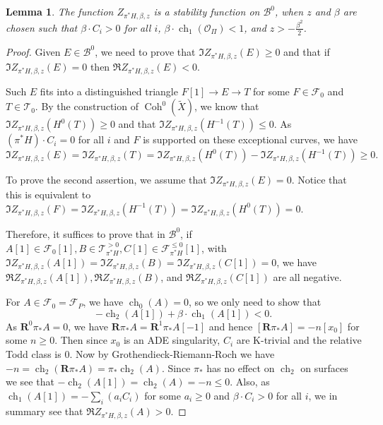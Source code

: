 \documentclass[12pt]{amsart}
\newtheorem{lemma}[theorem]{Lemma}
\theoremstyle{definition}
\DeclareMathOperator{\Coh}{Coh}
\DeclareMathOperator{\ch}{ch}
\begin{document}
\begin{lemma}\label{stabfunc}
The function $Z_{\pi^\ast H,\beta,z}$ is a stability function on $\mathcal{B}^0$, when $z$ and $\beta$ are chosen such that $\beta \cdot C_i>0$ for all $i$, 
$\beta \cdot \ch_1(\mathcal{O}_{\Pi}) <1$, and $z> -\frac{\beta^2}{2}$.
\end{lemma}
\begin{proof}
Given $E \in \mathcal{B}^0$, we need to prove that $\Im Z_{\pi^\ast H,\beta,z}(E)\geq 0$ and that if $\Im Z_{\pi^\ast H,\beta,z}(E)=0$ then $\Re Z_{\pi^\ast H,\beta,z}(E)<0$.

Such $E$ fits into a distinguished triangle $F[1] \longrightarrow E \longrightarrow T$ for some $F \in \mathcal{F}_0$ and $T \in \mathcal{T}_0$.
By the construction of $\Coh^0(\widetilde{X})$, we know that $\Im Z_{\pi^\ast H,\beta,z}(H^0(T)) \geq 0$ and that $\Im Z_{\pi^\ast H,\beta,z}(H^{-1}(T)) \leq 0$.
As $(\pi^\ast H) \cdot C_i = 0$ for all $i$ and $F$ is supported on these exceptional curves, we have 
\[\Im Z_{\pi^\ast H,\beta,z}(E) = \Im Z_{\pi^\ast H,\beta,z}(T) = \Im Z_{\pi^\ast H,\beta,z}(H^0(T)) - \Im Z_{\pi^\ast H,\beta,z}(H^{-1}(T))\geq0.\]

To prove the second assertion, we assume that $\Im Z_{\pi^\ast H,\beta,z}(E)=0$. 
Notice that this is equivalent to  $\Im Z_{\pi^\ast H,\beta,z}(F)= \Im Z_{\pi^\ast H,\beta,z}(H^{-1}(T))= \Im Z_{\pi^\ast H,\beta,z}(H^0(T)) = 0$.

Therefore, it suffices to prove that in $\mathcal{B}^0$, if $A[1] \in \mathcal{F}_0[1], B \in \mathcal{T}^{> 0}_{\pi^\ast H}, C[1] \in \mathcal{F}^{\leq 0}_{\pi^\ast H}[1]$, with $\Im Z_{\pi^\ast H,\beta,z}(A[1])=\Im Z_{\pi^\ast H,\beta,z}(B)=\Im Z_{\pi^\ast H,\beta,z}(C[1])=0$, we have  $\Re Z_{\pi^\ast H,\beta,z}(A[1]), \Re Z_{\pi^\ast H,\beta,z}(B)$, and $ \Re Z_{\pi^\ast H,\beta,z}(C[1])$ are all negative.

For $A\in \mathcal{F}_0=\mathcal{F}_P$, we have $\ch_0(A)=0$, so we only need to show that $$-\ch_2(A[1])+\beta \cdot \ch_1(A[1]) <0.$$
As $\mathbf{R}^0\pi_\ast A=0$,
we have $\mathbf{R}\pi_\ast A =\mathbf{R}^1\pi_\ast A[-1]$ and hence $[\mathbf{R}\pi_\ast A]=-n[x_0]$ for some $n\geq 0$. 
Then since $x_0$ is an ADE singularity, $C_i$ are K-trivial and the relative Todd class is 0.
Now by Grothendieck-Riemann-Roch we have $-n=\ch_2(\mathbf{R}\pi_\ast A) = \pi_\ast \ch_2(A)$.
Since $\pi_\ast$ has no effect on $\ch_2$ on surfaces we see that $-\ch_2(A[1])=\ch_2(A)=-n \leq 0$.
Also, as $\ch_1(A[1])= -\displaystyle \sum_i (a_iC_i)$ for some $a_i \geq 0$ and $\beta \cdot C_i >0$ for all $i$, we in summary see that $\Re Z_{\pi^\ast H,\beta,z}(A)>0$.


\end{proof}
\end{document}
